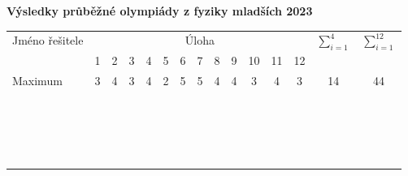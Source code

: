 \documentclass[12pt,a4paper,landscape]{article}
\begin{document}
\begin{center}
\textbf{\Large Výsledky průběžné olympiády z fyziky mladších 2023}
\vspace{1em}

{\large
\noindent\begin{tabular}{|l||c|c|c|c||c|c|c|c|c|c|c|c||c|c|}
\hline
\multirow{2}{*}{Jméno řešitele} & \multicolumn{12}{|c||}{Úloha} & \multirow{2}{*}{$\sum_{i=1}^{4}$} & \multirow{2}{*}{$\sum_{i=1}^{12}$} \\
\cline{2-13}
 & 1 & 2 & 3 & 4 & 5 & 6 & 7 & 8 & 9 & 10 & 11 & 12 & & \\
\hline
Maximum & 3 & 4 & 3 & 4 & 2 & 5 & 5 & 4 & 4 & 3 & 4 & 3 & 14 & 44 \\
\hline\hline
\phantom{Opravdu megalne dlouhe jmeno} & \phantom{111} & \phantom{111} & \phantom{111} & \phantom{111} & \phantom{111} & \phantom{111} & \phantom{111} & \phantom{111} & \phantom{111} & \phantom{111} & \phantom{111} & \phantom{111} & \phantom{111} & \phantom{111} \\
\hline
 & & & & & & & & & & & & & & \\
\hline
 & & & & & & & & & & & & & & \\
\hline
 & & & & & & & & & & & & & & \\
\hline
 & & & & & & & & & & & & & & \\
\hline
 & & & & & & & & & & & & & & \\
\hline
 & & & & & & & & & & & & & & \\
\hline
 & & & & & & & & & & & & & & \\
\hline
 & & & & & & & & & & & & & & \\
\hline
 & & & & & & & & & & & & & & \\
\hline
 & & & & & & & & & & & & & & \\
\hline
 & & & & & & & & & & & & & & \\
\hline
 & & & & & & & & & & & & & & \\
\hline
 & & & & & & & & & & & & & & \\
\hline
 & & & & & & & & & & & & & & \\
\hline
 & & & & & & & & & & & & & & \\
\hline
 & & & & & & & & & & & & & & \\
\hline
 & & & & & & & & & & & & & & \\
\hline
\end{tabular}
}
\end{center}
\end{document}
